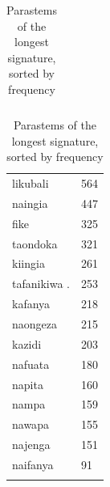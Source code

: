 \documentclass[output=paper,colorlinks,citecolor=brown]{langscibook}
\begin{document}
\begin{table}
\begin{minipage}{.3\textwidth}
\begin{tabular}{ll}
\end{tabular}
\end{minipage}
\begin{minipage}{.35\textwidth}
\begin{tabular}{ll}
{li}{kubali}     & 564 \\ 
{na}{ingi}a    & 447 \\ 
{fik}e & 325 \\ 
{ta}{ondok}a & 321 \\   
{ki}{ingi}a   & 261 \\ 
{ta}{fanikiw}a .  & 253  \\ 
{ka}{fany}a   & 218 \\ 
{na}{ongez}a   & 215 \\ 
{ka}{zidi}     & 203 \\ 
{na}{fuat}a  & 180 \\ 
{na}{pit}a    & 160 \\ 
{na}m{p}a    & 159 \\ 
{na}wa{p}a    & 155 \\ 
{na}{jeng}a    & 151 \\ 
{na}i{fany}a    &91 \\ 

\lspbottomrule
\end{tabular}
\end{minipage}
\caption{Parastems of the longest signature, sorted by frequency}
\label{topsigstems}
\end{table}
%
%
\end{document}
